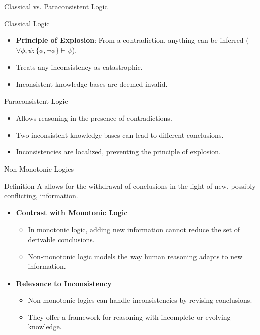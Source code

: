 \begin{frame}{Classical vs. Paraconsistent Logic}
    \begin{block}{Classical Logic}
        \begin{itemize}
            \item \textbf{Principle of Explosion}: From a contradiction, anything can be inferred (\( \forall \phi, \psi: \{\phi, \neg \phi\} \vdash \psi \)).
            \item Treats any inconsistency as catastrophic.
            \item Inconsistent knowledge bases are deemed invalid.
        \end{itemize}
    \end{block}
    \begin{block}{Paraconsistent Logic}
        \begin{itemize}
            \item Allows reasoning in the presence of contradictions.
            \item Two inconsistent knowledge bases can lead to different conclusions.
            \item Inconsistencies are localized, preventing the principle of explosion.
        \end{itemize}
    \end{block}
\end{frame}

\begin{frame}{Non-Monotonic Logics}
    \begin{block}{Definition}
        A  allows for the withdrawal of conclusions in the light of new, possibly conflicting, information.
    \end{block}
    \begin{itemize}
        \item \textbf{Contrast with Monotonic Logic}
              \begin{itemize}
                  \item In monotonic logic, adding new information cannot reduce the set of derivable conclusions.
                  \item Non-monotonic logic models the way human reasoning adapts to new information.
              \end{itemize}
        \item \textbf{Relevance to Inconsistency}
              \begin{itemize}
                  \item Non-monotonic logics can handle inconsistencies by revising conclusions.
                  \item They offer a framework for reasoning with incomplete or evolving knowledge.
              \end{itemize}
    \end{itemize}
\end{frame}

